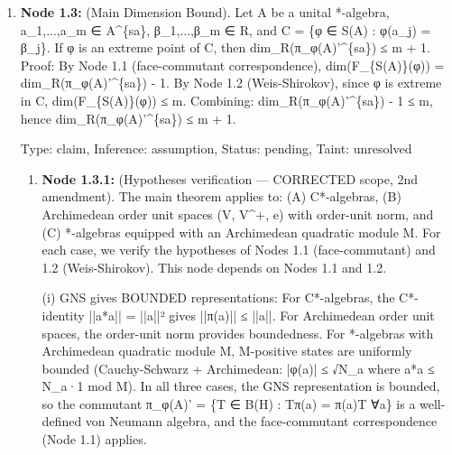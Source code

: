 \documentclass{article}
\begin{document}
\begin{enumerate}
\begin{enumerate}
The generalized version (allowing f : K → R ∪ \{+∞\} with f lower semicontinuous) is needed for unbounded observables in infinite-dimensional quantum mechanics: for an unbounded self-adjoint operator H affiliated with B(H), f(ρ) = Tr(Hρ) may equal +∞ when ρ is a density operator not in the form domain of H. This generalization is used in Node 1.8.3 (energy constraints). This is a deduction depending on the definitions of generalized\_affine\_map, state\_space, and self\_adjoint\_part.

  Type: claim, Inference: assumption, Status: pending, Taint: unresolved

\end{enumerate}
\item \textbf{Node 1.3:} (Main Dimension Bound). Let A be a unital *-algebra, a\_1,...,a\_m ∈ A\textasciicircum{}\{sa\}, β\_1,...,β\_m ∈ R, and C = \{φ ∈ S(A) : φ(a\_j) = β\_j\}. If φ is an extreme point of C, then dim\_R(π\_φ(A)'\textasciicircum{}\{sa\}) ≤ m + 1. Proof: By Node 1.1 (face-commutant correspondence), dim(F\_\{S(A)\}(φ)) = dim\_R(π\_φ(A)'\textasciicircum{}\{sa\}) - 1. By Node 1.2 (Weis-Shirokov), since φ is extreme in C, dim(F\_\{S(A)\}(φ)) ≤ m. Combining: dim\_R(π\_φ(A)'\textasciicircum{}\{sa\}) - 1 ≤ m, hence dim\_R(π\_φ(A)'\textasciicircum{}\{sa\}) ≤ m + 1.

  Type: claim, Inference: assumption, Status: pending, Taint: unresolved

\begin{enumerate}
\item \textbf{Node 1.3.1:} (Hypotheses verification — CORRECTED scope, 2nd amendment). The main theorem applies to: (A) C*-algebras, (B) Archimedean order unit spaces (V, V\textasciicircum{}+, e) with order-unit norm, and (C) *-algebras equipped with an Archimedean quadratic module M. For each case, we verify the hypotheses of Nodes 1.1 (face-commutant) and 1.2 (Weis-Shirokov). This node depends on Nodes 1.1 and 1.2.

(i) GNS gives BOUNDED representations: For C*-algebras, the C*-identity ||a*a|| = ||a||² gives ||π(a)|| ≤ ||a||. For Archimedean order unit spaces, the order-unit norm provides boundedness. For *-algebras with Archimedean quadratic module M, M-positive states are uniformly bounded (Cauchy-Schwarz + Archimedean: |φ(a)| ≤ √N\_a where a*a ≤ N\_a·1 mod M). In all three cases, the GNS representation is bounded, so the commutant π\_φ(A)' = \{T ∈ B(H) : Tπ(a) = π(a)T ∀a\} is a well-defined von Neumann algebra, and the face-commutant correspondence (Node 1.1) applies.


\end{enumerate}
\end{enumerate}
\end{document}
